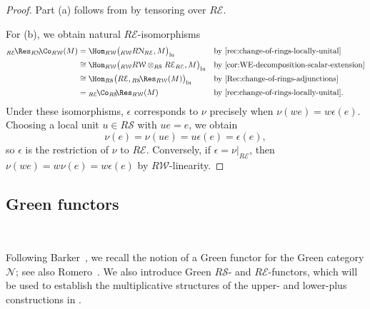 \documentclass{amsart}
\numberwithin{equation}{section}%
\theoremstyle{remark}
\theoremstyle{definition}
\newcommand{\e}{\mathcal E}
\newcommand{\s}{\mathcal S}
\newcommand{\n}{\mathcal N}
\newcommand{\w}{\mathcal W}
\newcommand{\iRes}[2]{{}_{#1}\!\Res_{#2}}
\newcommand{\iCo}[2]{{}_{#1}\!\Co_{#2}}
\begin{document}
%
\begin{proof}
Part \textup{(a)} follows from
 by tensoring over
$R\e$.

For \textup{(b)}, we obtain natural $R\e$-isomorphisms
%
\[
\begin{aligned}
	\iRes{R\e}{R\n}\!
	\iCo{}{R\w}(M)
	&=
	\Hom_{R\w}
	\bigl(
	{}_{R\w}R\n_{R\e},M
	\bigr)_{\mathrm{lu}}
	&&\text{by \Cref{rec:change-of-rings-locally-unital}}
	\\[.1em]
	&\cong
	\Hom_{R\w}
	\bigl(
	{}_{R\w}
	R\w\otimes_{R\s}R\e_{R\e},
	M
	\bigr)_{\mathrm{lu}}
	&&\text{by \Cref{cor:WE-decomposition-scalar-extension}}
	\\[.1em]
	&\cong
	\Hom_{R\s}
	\bigl(
	R\e,
	\iRes{R\s}{R\w}(M)
	\bigr)_{\mathrm{lu}}
	&&\text{by \Cref{Rec:change-of-rings-adjunctions}}
	\\[.1em]
	&=
	\iCo{R\e}{R\s}\!
	\iRes{}{R\w}(M)
	&&\text{by \Cref{rec:change-of-rings-locally-unital}.}
\end{aligned}
\]
%
Under these isomorphisms, $\epsilon$ corresponds to $\nu$ precisely
when
$\nu(we)=w\epsilon(e)$.
Choosing a local unit $u\in R\s$ with $ue=e$, we obtain
%
\[
\nu(e)=\nu(ue)=u\epsilon(e)=\epsilon(e),
\]
%
so $\epsilon$ is the restriction of $\nu$ to $R\e$.
Conversely, if $\epsilon=\nu|_{R\e}$, then
$\nu(we)=w\nu(e)=w\epsilon(e)$ by $R\w$-linearity.
\end{proof}


%
\subsection{Green functors}\
\label{ssec:green-functors}
%


Following Barker~\cite[Sec.~3]{Barker16b}, we recall
the notion of a Green functor for the Green category $\n$;
see also Romero~\cite[Sec.~2]{Romero12}.
We also introduce Green $R\s$- and $R\e$-functors,
which will be used to establish the multiplicative structures
of the upper- and lower-plus constructions in
.
\end{document}
